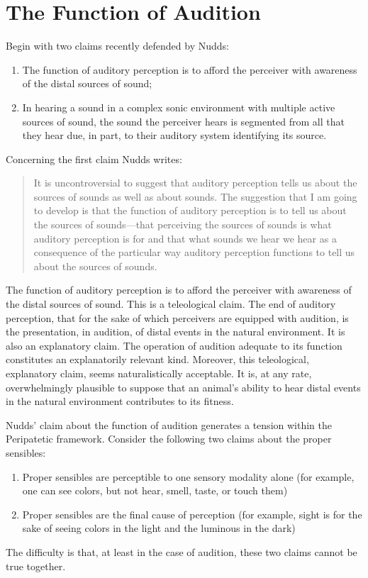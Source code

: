 
\section{The Function of Audition} %
\label{sec:the_function_of_audition}


Begin with two claims recently defended by Nudds:
\begin{enumerate}[(1)]
	\item The function of auditory perception is to afford the perceiver with awareness of the distal sources of sound;
	\item In hearing a sound in a complex sonic environment with multiple active sources of sound, the sound the perceiver hears is segmented from all that they hear due, in part, to their auditory system identifying its source.
\end{enumerate}

Concerning the first claim Nudds writes:
\begin{quote}
	It is uncontroversial to suggest that auditory perception tells us about the sources of sounds as well as about sounds. The suggestion that I am going to develop is that the function of auditory perception is to tell us about the sources of sounds---that perceiving the sources of sounds is what auditory perception is for and that what sounds we hear we hear as a consequence of the particular way auditory perception functions to tell us about the sources of sounds. \citep[284]{Nudds:2010aa}
\end{quote}
The function of auditory perception is to afford the perceiver with awareness of the distal sources of sound. This is a teleological claim. The end of auditory perception, that for the sake of which perceivers are equipped with audition, is the presentation, in audition, of distal events in the natural environment. It is also an explanatory claim. The operation of audition adequate to its function constitutes an explanatorily relevant kind. Moreover, this teleological, explanatory claim, seems naturalistically acceptable. It is, at any rate, overwhelmingly plausible to suppose that an animal's ability to hear distal events in the natural environment contributes to its fitness.

Nudds' claim about the function of audition generates a tension within the Peripatetic framework. Consider the following two claims about the proper sensibles:
\begin{enumerate}[(1)]
	\item Proper sensibles are perceptible to one sensory modality alone (for example, one can see colors, but not hear, smell, taste, or touch them)
	\item Proper sensibles are the final cause of perception (for example, sight is for the sake of seeing colors in the light and the luminous in the dark)
\end{enumerate}
The difficulty is that, at least in the case of audition, these two claims cannot be true together.

